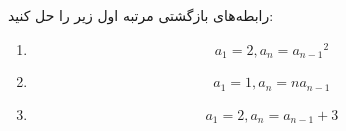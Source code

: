     \p 
رابطه‌های بازگشتی مرتبه اول زیر را حل کنید:
\begin{enumerate}
\item
$$a_1 = 2, a_n = {a_{n-1}}^2$$
\item
$$a_1 = 1, a_n = na_{n-1}$$
\item
$$a_1 = 2, a_n = a_{n-1} + 3$$
\end{enumerate}
